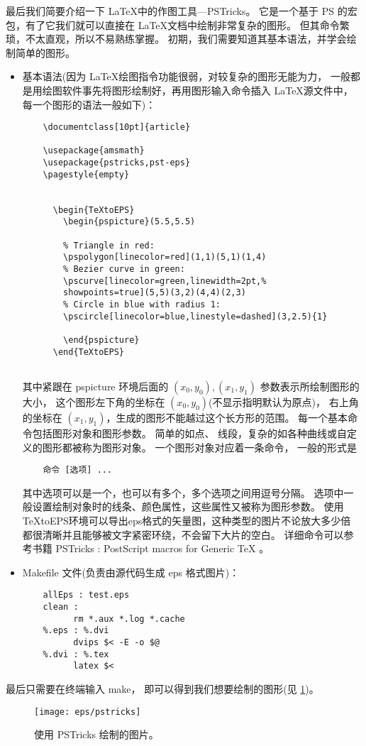 最后我们简要介绍一下 \LaTeX 中的作图工具---PSTricks。
它是一个基于 PS 的宏包，有了它我们就可以直接在 \LaTeX 文档中绘制非常复杂的图形。
但其命令繁琐，不太直观，所以不易熟练掌握。
初期，我们需要知道其基本语法，并学会绘制简单的图形。

\begin{itemize}
	
	\item 基本语法(因为 \LaTeX 绘图指令功能很弱，对较复杂的图形无能为力，
	一般都是用绘图软件事先将图形绘制好，再用图形输入命令插入 \LaTeX 源文件中，
	每一个图形的语法一般如下)：
	\begin{verbatim}
	\documentclass[10pt]{article}

	\usepackage{amsmath}
	\usepackage{pstricks,pst-eps}
	\pagestyle{empty}

	
  	  \begin{TeXtoEPS}
    	\begin{pspicture}(5.5,5.5)

      	% Triangle in red:
      	\pspolygon[linecolor=red](1,1)(5,1)(1,4)
      	% Bezier curve in green:
      	\pscurve[linecolor=green,linewidth=2pt,%
      	showpoints=true](5,5)(3,2)(4,4)(2,3)
     	% Circle in blue with radius 1:
      	\pscircle[linecolor=blue,linestyle=dashed](3,2.5){1}

    	\end{pspicture}
  	  \end{TeXtoEPS}
	
	\end{verbatim}
	其中紧跟在 pspicture 环境后面的 $(x_0,y_0), (x_1,y_1)$ 参数表示所绘制图形的大小，
	这个图形左下角的坐标在 $(x_0,y_0)$(不显示指明默认为原点)，
	右上角的坐标在 $(x_1,y_1)$，生成的图形不能越过这个长方形的范围。
	每一个基本命令包括图形对象和图形参数。
	简单的如点、 线段，复杂的如各种曲线或自定义的图形都被称为图形对象。
	一个图形对象对应着一条命令， 一般的形式是
	\begin{verbatim}
	命令 [选项] ... 
	\end{verbatim}	
	其中选项可以是一个，也可以有多个，多个选项之间用逗号分隔。
	选项中一般设置绘制对象时的线条、颜色属性，这些属性又被称为图形参数。
        使用TeXtoEPS环境可以导出eps格式的矢量图，这种类型的图片不论放大多少倍
        都很清晰并且能够被文字紧密环绕，不会留下大片的空白。
	详细命令可以参考书籍
	PSTricks : PostScript macros for Generic TeX \cite{van1993pstricks}。

       
	\item Makefile 文件(负责由源代码生成 eps 格式图片)：
	\begin{verbatim}
	allEps : test.eps
	clean :
　　　		rm *.aux *.log *.cache
	%.eps : %.dvi
　　　		dvips $< -E -o $@
	%.dvi : %.tex
　　　		latex $<
	\end{verbatim}
\end{itemize}

最后只需要在终端输入 make，
即可以得到我们想要绘制的图形(见 \ref{fig:pstricks})。

\begin{figure}[htbp]
	\centering
	\texttt{[image: eps/pstricks]}
	\caption{使用 PSTricks 绘制的图片。}
	\label{fig:pstricks}
\end{figure}


